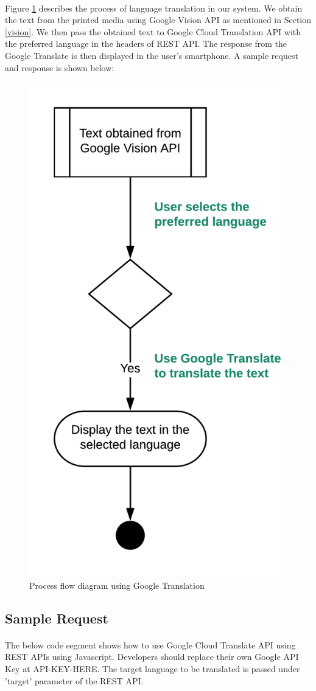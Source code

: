 \documentclass[12pt]{article}
\begin{document}
\paragraph{}Figure \ref{fig:translate_uml} describes the process of language translation in our system. We obtain the text from the printed media using Google Vision API as mentioned in Section \ref{vision}. We then pass the obtained text to Google Cloud Translation API with the preferred language in the headers of REST API. The response from the Google Translate is then displayed in the user's smartphone. A sample request and response is shown below:

\begin{figure}[H]
	\centering
	\includegraphics[width=0.5\linewidth]{media/Translate.png}
	\caption{Process flow diagram using Google Translation}
	\label{fig:translate_uml}
\end{figure} 

\subsection{Sample Request}

\paragraph{}The below code segment shows how to use Google Cloud Translate API using REST APIs using Javascript. Developers should replace their own Google API Key at  API-KEY-HERE. The target language to be translated is passed under 'target' parameter of the REST API. 
\end{document}
